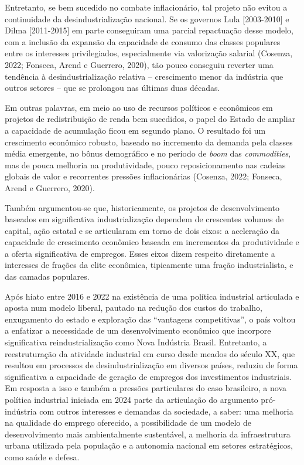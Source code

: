 Entretanto, se bem sucedido no combate inflacionário, tal projeto não
evitou a continuidade da desindustrialização nacional. Se os governos
Lula {[}2003-2010{]} e Dilma {[}2011-2015{]} em parte conseguiram uma
parcial repactuação desse modelo, com a inclusão da expansão da
capacidade de consumo das classes populares entre os interesses
privilegiados, especialmente via valorização salarial (Cosenza, 2022;
Fonseca, Arend e Guerrero, 2020), tão pouco conseguiu reverter uma
tendência à desindustrialização relativa -- crescimento menor da
indústria que outros setores -- que se prolongou nas últimas duas
décadas.

Em outras palavras, em meio ao uso de recursos políticos e econômicos em
projetos de redistribuição de renda bem sucedidos, o papel do Estado de
ampliar a capacidade de acumulação ficou em segundo plano. O resultado
foi um crescimento econômico robusto, baseado no incremento da demanda
pela classes média emergente, no bônus demográfico e no período de
\emph{boom} das \emph{commodities}, mas de pouca melhoria na
produtividade, pouco reposicionamento nas cadeias globais de valor e
recorrentes pressões inflacionárias (Cosenza, 2022; Fonseca, Arend e
Guerrero, 2020).

Também argumentou-se que, historicamente, os projetos de desenvolvimento
baseados em significativa industrialização dependem de crescentes
volumes de capital, ação estatal e se articularam em torno de dois
eixos: a aceleração da capacidade de crescimento econômico baseada em
incrementos da produtividade e a oferta significativa de empregos. Esses
eixos dizem respeito diretamente a interesses de frações da elite
econômica, tipicamente uma fração industrialista, e das camadas
populares.

Após hiato entre 2016 e 2022 na existência de uma política industrial
articulada e aposta num modelo liberal, pautado na redução dos custos do
trabalho, enxugamento do estado e exploração das ``vantagens
competitivas'', o país voltou a enfatizar a necessidade de um
desenvolvimento econômico que incorpore significativa reindustrialização
como Nova Indústria Brasil. Entretanto, a reestruturação da atividade
industrial em curso desde meados do século XX, que resultou em processos
de desindustrialização em diversos países, reduziu de forma
significativa a capacidade de geração de empregos dos investimentos
industriais. Em resposta a isso e também a pressões particulares do caso
brasileiro, a nova política industrial iniciada em 2024 parte da
articulação do argumento pró-indústria com outros interesses e demandas
da sociedade, a saber: uma melhoria na qualidade do emprego oferecido, a
possibilidade de um modelo de desenvolvimento mais ambientalmente
sustentável, a melhoria da infraestrutura urbana utilizada pela
população e a autonomia nacional em setores estratégicos, como saúde e
defesa.

